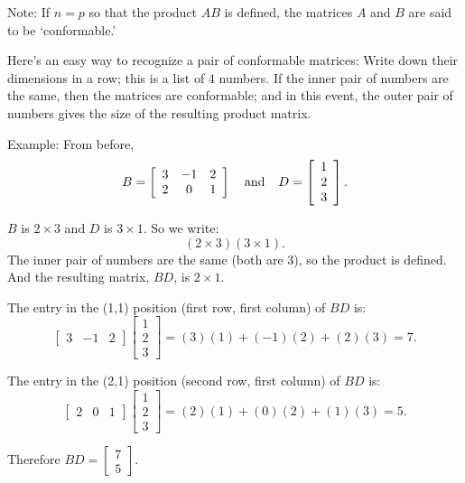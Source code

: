 \documentclass[12pt]{article}
\begin{document}
Note: If $n=p$ so that the product $AB$ is defined, the matrices $A$ and $B$ are
said to be `conformable.'

Here's an easy way to recognize a pair of conformable matrices: Write down their
dimensions in a row; this is a list of 4 numbers.  If the inner pair of numbers
are the same, then the matrices are conformable; and in this event, the outer pair of
numbers gives the size of the resulting product matrix.

Example:  From before,
\[
  B =  \left[ \begin{array}{ccc}  3 & -1 & 2 \\ 2 & 0 & 1  \end{array} \right]
 \hspace{.1in}
 {\mbox{ and }}
 \hspace{.1in}
 D =  \left[ \begin{array}{c}  1 \\ 2 \\ 3 \end{array} \right].
 \]

$B$ is $2 \times 3$ and $D$ is $3 \times 1$.  So we write:
$$(2 \times 3) (3 \times 1).$$  The inner pair of numbers are the same (both are 3),
so the product is defined.  And the resulting matrix, $BD$, is $2 \times 1$.

The entry in the (1,1) position (first row, first column) of $BD$ is:
$$ \left[ \begin{array}{ccc}  3 & -1 & 2 \end{array} \right]
 \left[ \begin{array}{c}  1 \\ 2 \\ 3 \end{array} \right]
 = (3)(1) + (-1)(2) + (2)(3) = 7.$$

The entry in the (2,1) position (second row, first column) of $BD$ is:
$$ \left[ \begin{array}{ccc}  2 & 0 & 1 \end{array} \right]
 \left[ \begin{array}{c}  1 \\ 2 \\ 3 \end{array} \right]
 = (2)(1) + (0)(2) + (1)(3) = 5.$$

Therefore $BD = \left[ \begin{array}{c}  7 \\ 5 \end{array} \right].$
\end{document}
